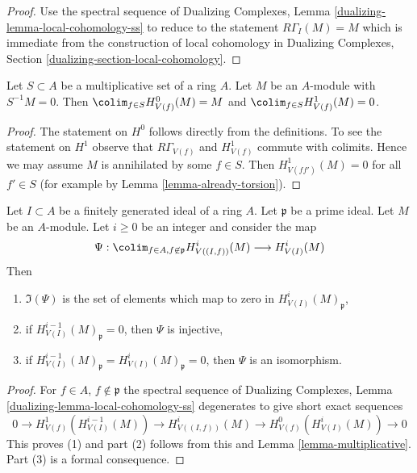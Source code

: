 \begin{proof}
Use the spectral sequence of
Dualizing Complexes, Lemma \ref{dualizing-lemma-local-cohomology-ss}
to reduce to the statement $R\Gamma_I(M) = M$ which is immediate
from the construction of local cohomology
in Dualizing Complexes, Section \ref{dualizing-section-local-cohomology}.
\end{proof}

\begin{lemma}
\label{lemma-multiplicative}
Let $S \subset A$ be a multiplicative set of a ring $A$.
Let $M$ be an $A$-module with $S^{-1}M = 0$. Then
$\colim_{f \in S} H^0_{V(f)}(M) = M$ and
$\colim_{f \in S} H^1_{V(f)}(M) = 0$.
\end{lemma}

\begin{proof}
The statement on $H^0$ follows directly from the definitions.
To see the statement on $H^1$ observe that $R\Gamma_{V(f)}$
and $H^1_{V(f)}$ commute with colimits. Hence we may assume
$M$ is annihilated by some $f \in S$. Then
$H^1_{V(ff')}(M) = 0$ for all $f' \in S$ (for example by
Lemma \ref{lemma-already-torsion}).
\end{proof}

\begin{lemma}
\label{lemma-elements-come-from-bigger}
Let $I \subset A$ be a finitely generated ideal of a ring $A$.
Let $\mathfrak p$ be a prime ideal. Let $M$ be an $A$-module.
Let $i \geq 0$ be an integer and consider the map
$$
\Psi :
\colim_{f \in A, f \not \in \mathfrak p} H^i_{V((I, f))}(M)
\longrightarrow
H^i_{V(I)}(M)
$$
Then
\begin{enumerate}
\item $\Im(\Psi)$ is the set of elements which map to zero in
$H^i_{V(I)}(M)_\mathfrak p$,
\item if $H^{i - 1}_{V(I)}(M)_\mathfrak p = 0$, then $\Psi$ is injective,
\item if $H^{i - 1}_{V(I)}(M)_\mathfrak p = H^i_{V(I)}(M)_\mathfrak p = 0$,
then $\Psi$ is an isomorphism.
\end{enumerate}
\end{lemma}

\begin{proof}
For $f \in A$, $f \not \in \mathfrak p$ the spectral sequence of
Dualizing Complexes, Lemma \ref{dualizing-lemma-local-cohomology-ss}
degenerates to give short exact sequences
$$
0 \to H^1_{V(f)}(H^{i - 1}_{V(I)}(M)) \to
H^i_{V((I, f))}(M) \to H^0_{V(f)}(H^i_{V(I)}(M)) \to 0
$$
This proves (1) and part (2) follows from this and
Lemma \ref{lemma-multiplicative}.
Part (3) is a formal consequence.
\end{proof}

